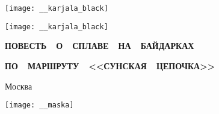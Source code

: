 \begin{titlepage}
	\newpage
	\begin{center}
		\Large \textbf \MyVarAuthorName
	\end{center}	
	\vspace{0.75cm}	
	\begin{center}
 	\texttt{[image: \_\_karjala\_black]}
	\end{center}	
	\begin{center}
		\Huge{}
	\end{center}	
%
	\begin{center}
	\texttt{[image: \_\_karjala\_black]}
	\end{center}
%
	\begin{center}
		\footnotesize
%	
		{
		\textbf{ПОВЕСТЬ~~О~~СПЛАВЕ~~НА~~БАЙДАРКАХ}}
		
		{
		\textbf{ПО~~МАРШРУТУ~~<<СУНСКАЯ~~ЦЕПОЧКА>>}}		
	\end{center}
%
	\vspace{\fill}	
	\begin{center}\normalsize Москва\end{center}
	\vspace{-1.1cm}
	\begin{center}\texttt{[image: \_\_maska]}\end{center}
	\vspace{-1.24cm}
	\begin{center}\normalsize \year\end{center}		
	\begin{flushleft}%
		\textbf{%
		}
	\end{flushleft}%
\end{titlepage}